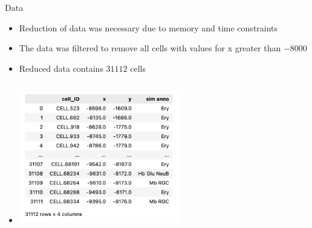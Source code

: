 \documentclass{beamer}
\begin{document}
\begin{frame}{Data}

\begin{itemize}
    \item<1-> Reduction of data was necessary due to memory and time constraints
    \item<2-> The data was filtered to remove all cells with values for x greater than $-8000$
    \item<3-> Reduced data contains $31112$ cells
    \item<4-> []
    \begin{columns}
        \begin{column}{0.9\textwidth} %
          \includegraphics[width=0.55\textwidth]{reducedDataCSV.png}
          \caption{Reduced data in CSV format}
        \end{column}
    \end{columns}
        
\end{itemize}

\end{frame}
\end{document}
